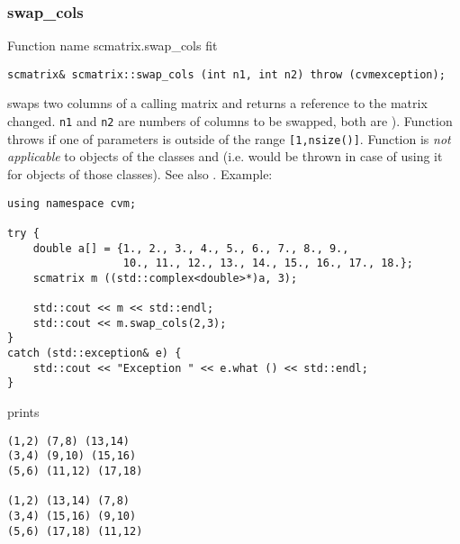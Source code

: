 \subsubsection{swap\_cols}
Function%
\pdfdest name {scmatrix.swap_cols} fit
\begin{verbatim}
scmatrix& scmatrix::swap_cols (int n1, int n2) throw (cvmexception);
\end{verbatim}
swaps two columns of a calling matrix and returns a reference to
the matrix changed. \verb"n1" and \verb"n2" are
 numbers of columns to be swapped, 
both are \Based).
Function throws  
if one of  parameters is outside of the range
\verb"[1,nsize()]".
Function is 
\emph{not applicable} to objects of the classes
 and
 (i.e.  would be thrown
in case of using it for objects of those classes).
See also .
Example:
\begin{Verbatim}
using namespace cvm;

try {
    double a[] = {1., 2., 3., 4., 5., 6., 7., 8., 9.,
                  10., 11., 12., 13., 14., 15., 16., 17., 18.};
    scmatrix m ((std::complex<double>*)a, 3);

    std::cout << m << std::endl;
    std::cout << m.swap_cols(2,3);
}
catch (std::exception& e) {
    std::cout << "Exception " << e.what () << std::endl;
}
\end{Verbatim}
prints
\begin{Verbatim}
(1,2) (7,8) (13,14)
(3,4) (9,10) (15,16)
(5,6) (11,12) (17,18)

(1,2) (13,14) (7,8)
(3,4) (15,16) (9,10)
(5,6) (17,18) (11,12)
\end{Verbatim}
\newpage




